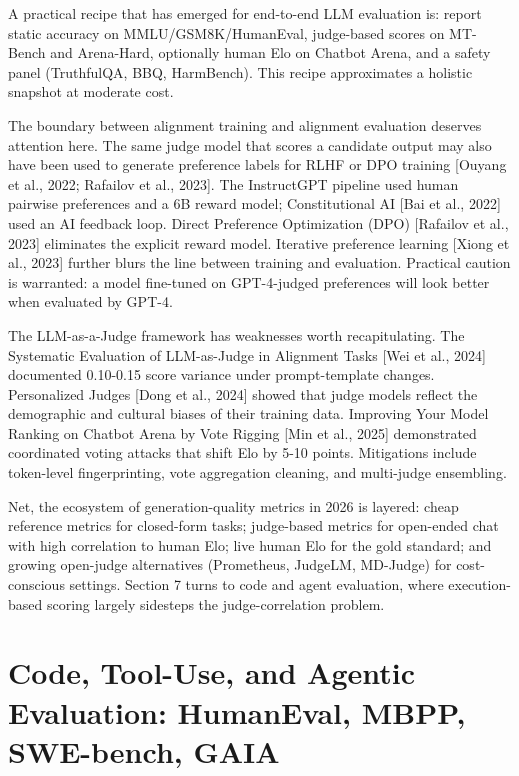 A practical recipe that has emerged for end-to-end LLM evaluation is: report static accuracy on MMLU/GSM8K/HumanEval, judge-based scores on MT-Bench and Arena-Hard, optionally human Elo on Chatbot Arena, and a safety panel (TruthfulQA, BBQ, HarmBench). This recipe approximates a holistic snapshot at moderate cost.

The boundary between alignment training and alignment evaluation deserves attention here. The same judge model that scores a candidate output may also have been used to generate preference labels for RLHF or DPO training {[}Ouyang et al., 2022; Rafailov et al., 2023{]}. The InstructGPT pipeline used human pairwise preferences and a 6B reward model; Constitutional AI {[}Bai et al., 2022{]} used an AI feedback loop. Direct Preference Optimization (DPO) {[}Rafailov et al., 2023{]} eliminates the explicit reward model. Iterative preference learning {[}Xiong et al., 2023{]} further blurs the line between training and evaluation. Practical caution is warranted: a model fine-tuned on GPT-4-judged preferences will look better when evaluated by GPT-4.

The LLM-as-a-Judge framework has weaknesses worth recapitulating. The Systematic Evaluation of LLM-as-Judge in Alignment Tasks {[}Wei et al., 2024{]} documented 0.10-0.15 score variance under prompt-template changes. Personalized Judges {[}Dong et al., 2024{]} showed that judge models reflect the demographic and cultural biases of their training data. Improving Your Model Ranking on Chatbot Arena by Vote Rigging {[}Min et al., 2025{]} demonstrated coordinated voting attacks that shift Elo by 5-10 points. Mitigations include token-level fingerprinting, vote aggregation cleaning, and multi-judge ensembling.

Net, the ecosystem of generation-quality metrics in 2026 is layered: cheap reference metrics for closed-form tasks; judge-based metrics for open-ended chat with high correlation to human Elo; live human Elo for the gold standard; and growing open-judge alternatives (Prometheus, JudgeLM, MD-Judge) for cost-conscious settings. Section 7 turns to code and agent evaluation, where execution-based scoring largely sidesteps the judge-correlation problem.

\section{Code, Tool-Use, and Agentic Evaluation: HumanEval, MBPP, SWE-bench, GAIA}\label{code-tool-use-and-agentic-evaluation-humaneval-mbpp-swe-bench-gaia}

